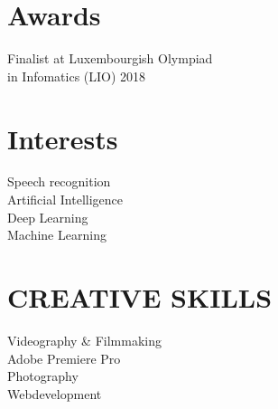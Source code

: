 \documentclass[]{curriculumvitae}
\begin{document}
\begin{minipage}[t]{0.34\textwidth}
\section{Awards}
Finalist at Luxembourgish Olympiad\\
in Infomatics (LIO) 2018
\sectionsep

\section{Interests}
Speech recognition\\
Artificial Intelligence\\
Deep Learning\\
Machine Learning
\sectionsep

\section{CREATIVE SKILLS}
Videography \& Filmmaking\\
Adobe Premiere Pro\\
Photography\\
Webdevelopment
\sectionsep


\end{minipage} 
\hfill
\end{document}
